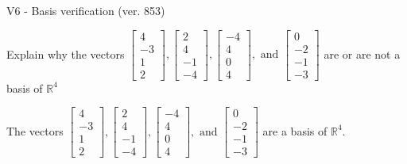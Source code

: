 \begin{exercise}
  \begin{exerciseTitle}V6 - Basis verification (ver. 853)\end{exerciseTitle}
  \begin{exerciseStatement}
    Explain why the vectors \(\left[\begin{array}{r}
4 \\
-3 \\
1 \\
2
\end{array}\right] , \left[\begin{array}{r}
2 \\
4 \\
-1 \\
-4
\end{array}\right] , \left[\begin{array}{r}
-4 \\
4 \\
0 \\
4
\end{array}\right] , \text{ and } \left[\begin{array}{r}
0 \\
-2 \\
-1 \\
-3
\end{array}\right]\) are or are not a basis of \(\mathbb{R}^4\)	


  \end{exerciseStatement}
  \begin{exerciseAnswer}
   The vectors \(\left[\begin{array}{r}
4 \\
-3 \\
1 \\
2
\end{array}\right] , \left[\begin{array}{r}
2 \\
4 \\
-1 \\
-4
\end{array}\right] , \left[\begin{array}{r}
-4 \\
4 \\
0 \\
4
\end{array}\right] , \text{ and } \left[\begin{array}{r}
0 \\
-2 \\
-1 \\
-3
\end{array}\right]\) 
  	 are  a basis of \(\mathbb{R}^4\).
  


  \end{exerciseAnswer}
\end{exercise}